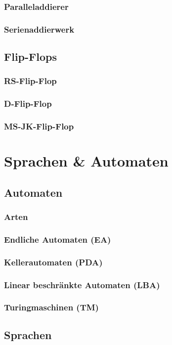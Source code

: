 \documentclass{article}
\begin{document}
\subsubsection{Paralleladdierer}
\subsubsection{Serienaddierwerk}
\subsection{Flip-Flops}
\subsubsection{RS-Flip-Flop}
\subsubsection{D-Flip-Flop}
\subsubsection{MS-JK-Flip-Flop}
\section{Sprachen \& Automaten}
\subsection{Automaten}
\subsubsection{Arten}
\subsubsection{Endliche Automaten (EA)}
\subsubsection{Kellerautomaten (PDA)}
\subsubsection{Linear beschränkte Automaten (LBA)}
\subsubsection{Turingmaschinen (TM)}
\subsection{Sprachen}
\end{document}
